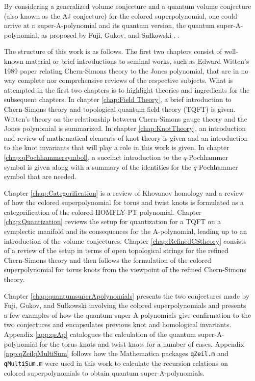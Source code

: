 \documentclass[a4paper,titlepage,twoside]{book}
\begin{document}
By considering a generalized volume conjecture and a quantum volume conjecture (also known as the AJ conjecture) for the colored superpolynomial, one could arrive at a super-A-polynomial and its quantum version, the quantum super-A-polynomial, as proposed by Fuji, Gukov, and Su\l kowski \cite{bib:FGS2012}, \cite{FujiSulkowski2013}.  

The structure of this work is as follows.  The first two chapters consist of well-known material or brief introductions to seminal works, such as Edward Witten's 1989 paper relating Chern-Simons theory to the Jones polynomial, that are in no way complete nor comprehensive reviews of the respective subjects.  What is attempted in the first two chapters is to highlight theories and ingredients for the subsequent chapters.  In chapter \ref{chap:Field Theory}, a brief introduction to Chern-Simons theory and topological quantum field theory (TQFT) is given.  Witten's theory on the relationship between Chern-Simons gauge theory and the Jones polynomial is summarized. In chapter \ref{chap:KnotTheory}, an introduction and review of mathematical elements of knot theory is given and an introduction to the knot invariants that will play a role in this work is given.  In chapter \ref{chap:qPochhammersymbol}, a succinct introduction to the $q$-Pochhammer symbol is given along with a summary of the identities for the $q$-Pochhammer symbol that are needed.  

Chapter \ref{chap:Categorification} is a review of Khovanov homology and a review of how the colored superpolynomial for torus and twist knots is formulated as a categorification of the colored HOMFLY-PT polynomial.  Chapter \ref{chap:Quantization} reviews the setup for quantization for a TQFT on a symplectic manifold and its consequences for the A-polynomial, leading up to an introduction of the volume conjectures.  Chapter \ref{chap:RefinedCStheory} consists of a review of the setup in terms of open topological strings for the refined Chern-Simons theory and then follows the formulation of the colored superpolynomial for torus knots from the viewpoint of the refined Chern-Simons theory.  

Chapter \ref{chap:quantumsuperApolynomials} presents the two conjectures made by Fuji, Gukov, and Su\l kowski involving the colored superpolynomials and presents a few examples of how the quantum super-A-polynomials give confirmation to the two conjectures and encapsulates previous knot and homological invariants.  Appendix \ref{app:qsAp} catalogues the calculation of the quantum super-A-polynomial for the torus knots and twist knots for a number of cases.  Appendix \ref{app:qZeilqMultiSum} follows how the Mathematica packages \texttt{qZeil.m} and \texttt{qMultiSum.m} were used in this work to calculate the recursion relations on colored superpolynomials to obtain quantum super-A-polynomials.  
\end{document}
